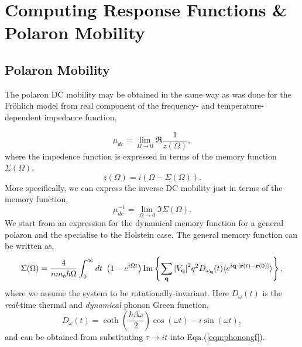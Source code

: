 \chapter{Computing Response Functions \& Polaron Mobility}
\label{chap:fifth}



\section{Polaron Mobility}
\label{sec:chap-fifth-first}

The polaron DC mobility may be obtained in the same way as was done for the Fr\"ohlich model from real component of the frequency- and temperature-dependent impedance function,

\begin{equation}\label{eqn:mobility}
    \mu_{dc} = \lim_{\Omega \to 0} \Re{\frac{1}{z(\Omega)}},
\end{equation}
where the impedence function is expressed in terms of the memory function $\Sigma(\Omega)$,
\begin{equation}
    z(\Omega) = i \left( \Omega - \Sigma(\Omega) \right).
\end{equation}
More specifically, we can express the inverse DC mobility just in terms of the memory function,
\begin{equation}
    \mu_{dc}^{-1} = \lim_{\Omega \to 0} \Im{\Sigma(\Omega)}.
\end{equation}
We start from an expression for the dynamical memory function for a general polaron and the specialise to the Holstein case. The general memory function can be written as,
\begin{equation}
    \Sigma(\Omega) = \frac{4}{n m_b \hbar\Omega} \int_0^{\infty} dt\ \left(1 - e^{i \Omega t}\right) \Im \left\{ \sum_{\vb{q}} \abs{V_{\vb{q}}}^2 q^2 D_{\omega_{\vb{q}}}(t) \langle e^{i \vb{q} \cdot \left[ \vb{r}(t) - \vb{r}(0) \right]} \rangle \right\},
\end{equation}
where we assume the system to be rotationally-invariant. Here $D_{\omega}(t)$ is the \emph{real}-time thermal and \emph{dynamical} phonon Green function,
\begin{equation}
    D_\omega(t) = \coth(\frac{\hbar \beta \omega}{2}) \cos(\omega t) - i \sin(\omega t),
\end{equation}
and can be obtained from substituting $\tau \to i t$ into Eqn.(\ref{eqn:phonongf}).
\newline

